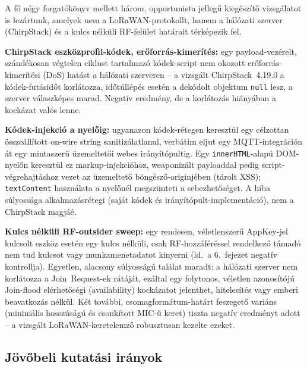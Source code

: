 \documentclass[12pt,a4paper]{article}
\begin{document}
A fő négy forgatókönyv mellett három, opportunista jellegű kiegészítő
vizsgálatot is lezártunk, amelyek nem a LoRaWAN-protokollt, hanem a
hálózati szerver (ChirpStack) és a kulcs nélküli RF-felület határait
térképezik fel.

\textbf{ChirpStack eszközprofil-kódek, erőforrás-kimerítés:} egy
payload-vezérelt, szándékosan végtelen ciklust tartalmazó kódek-script
nem okozott erőforrás-kimerítési (DoS) hatást a hálózati szerveren -- a
vizsgált ChirpStack~4.19.0 a kódek-futásidőt korlátozza, időtúllépés
esetén a dekódolt objektum \texttt{null} lesz, a szerver válaszképes
marad. Negatív eredmény, de a korlátozás hiányában a kockázat valós
lenne.

\textbf{Kódek-injekció a nyelőig:} ugyanazon kódek-rétegen keresztül egy
célzottan összeállított on-wire string sanitizálatlanul, verbátim eljut
egy MQTT-integráción át egy mintaszerű üzemeltetői webes irányítópultig.
Egy \texttt{innerHTML}-alapú DOM-nyelőn keresztül ez markup-injekcióhoz,
weaponizált payloaddal pedig script-végrehajtáshoz vezet az üzemeltető
böngésző-originjében (tárolt XSS); \texttt{textContent} használata a
nyelőnél megszünteti a sebezhetőséget. A hiba súlyossága alkalmazásrétegi
(saját kódek és irányítópult-implementáció), nem a ChirpStack magjáé.

\textbf{Kulcs nélküli RF-outsider sweep:} egy rendesen, véletlenszerű
AppKey-jel kulcsolt eszköz esetén egy kulcs nélküli, csak RF-hozzáféréssel
rendelkező támadó nem tud kulcsot vagy munkamenetadatot kinyerni (ld.\ a
6.\ fejezet negatív kontrollja). Egyetlen, alacsony súlyosságú találat
maradt: a hálózati szerver nem korlátozza a Join~Request-ek rátáját,
ezáltal egy folytonos, véletlen azonosítójú Join-flood elérhetőségi
(availability) kockázatot jelenthet, hitelesítés vagy emberi beavatkozás
nélkül. Két további, csomagformátum-határt feszegető variáns (minimális
hosszúságú és csonkított MIC-ű keret) tiszta negatív eredményt adott --
a vizsgált LoRaWAN-keretelemző robusztusan kezelte ezeket.

\subsection{Jövőbeli kutatási irányok}
\end{document}
